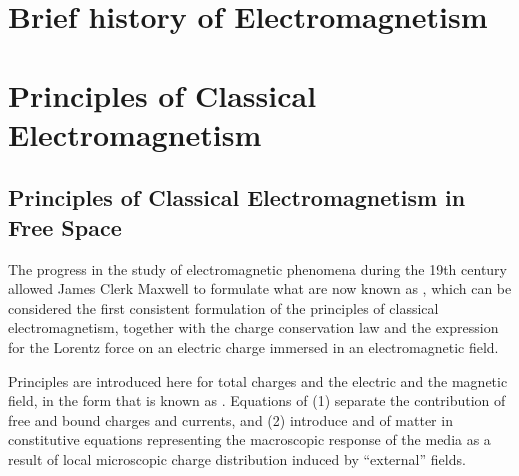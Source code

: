 \documentclass[letterpaper,10pt,english]{jupyterBook}
\begin{document}
\sphinxstepscope




\chapter{Brief history of Electromagnetism}
\label{\detokenize{ch/experiments:brief-history-of-electromagnetism}}\label{\detokenize{ch/experiments:classical-electromagnetism-first-experiments}}\label{\detokenize{ch/experiments::doc}}
\sphinxstepscope


\chapter{Principles of Classical Electromagnetism}
\label{\detokenize{ch/principles:principles-of-classical-electromagnetism}}\label{\detokenize{ch/principles:classical-electromagnetism-principles}}\label{\detokenize{ch/principles::doc}}
\sphinxstepscope




\section{Principles of Classical Electromagnetism in Free Space}
\label{\detokenize{ch/principles-vacuum:principles-of-classical-electromagnetism-in-free-space}}\label{\detokenize{ch/principles-vacuum:classical-electromagnetism-principles-free-space}}\label{\detokenize{ch/principles-vacuum::doc}}
\sphinxAtStartPar
The progress in the study of electromagnetic phenomena during the 19th century allowed James Clerk Maxwell to formulate what are now known as , which can be considered the first consistent formulation of the principles of classical electromagnetism, together with the charge conservation law and the expression for the Lorentz force on an electric charge immersed in an electromagnetic field.

\sphinxAtStartPar
Principles are introduced here for total charges and the electric and the magnetic field, in the form that is known as . Equations of  (1) separate the contribution of free and bound charges and currents, and (2) introduce  and  of matter in constitutive equations representing the macroscopic response of the media as a result of local microscopic charge distribution induced by “external” fields.
\end{document}
